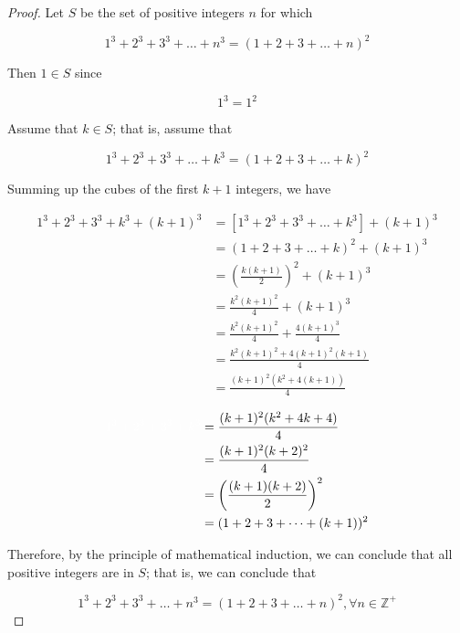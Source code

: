 \documentclass{article}
\begin{document}
    \begin{proof}

        Let $S$ be the set of positive integers $n$ for which

        \[
            1^3 + 2^3 + 3^3 + \dots + n^3 = (1+2+3+\dots +n)^2
        \]

        \noindent Then $1\in S$ since

        \[
            1^3 = 1^2
        \]

        \noindent Assume that $k\in S$; that is, assume that

        \[
            1^3 + 2^3 + 3^3 + \dots + k^3 = (1+2+3+\dots + k)^2
        \]

        \noindent Summing up the cubes of the first $k+1$ integers, we have

        \begin{align*}
            1^3 + 2^3 + 3^3 + k^3 + (k+1)^3     &= [1^3 +2^3 +3^3 +\dots +k^3] + (k+1)^3 \\
                                                &= (1+2+3+\dots +k)^2 + (k+1)^3 \\
                                                &= \left(\frac{k(k+1)}{2}\right)^2 + (k+1)^3 \\
                                                &= \frac{k^2 (k+1)^2}{4} + (k+1)^3 \\
                                                &= \frac{k^2 (k+1)^2}{4} + \frac{4(k+1)^3}{4} \\
                                                &= \frac{k^2 (k+1)^2 + 4(k+1)^2 (k+1)}{4} \\
                                                &= \frac{(k+1)^2 (k^2 +4(k+1))}{4}
        \end{align*}

        \pagebreak

        \begin{align*}
            \color{white} 1^3 + 2^3 + 3^3 + k^3           \color{black} &= \frac{(k+1)^2 (k^2 + 4k + 4)}{4} \\
                                                                        &= \frac{(k+1)^2 (k+2)^2}{4} \\
                                                                        &= \left(\frac{(k+1)(k+2)}{2} \right)^2 \\
                                                                        &= (1+2+3+\dots + (k+1))^2
        \end{align*}

        \noindent Therefore, by the principle of mathematical induction, we can conclude that all positive integers are in $S$; that is, we can conclude that

        \[
            1^3 + 2^3 + 3^3 + \dots + n^3 = (1+2+3+ \dots + n)^2, \forall n\in \mathbb{Z}^+
        \]


    \end{proof}
\end{document}
